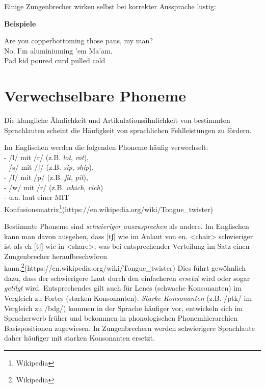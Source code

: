 \documentclass[
  letterpaper,
]{scrbook}
\begin{document}
Einige Zungenbrecher wirken selbst bei korrekter Aussprache lustig:\\

\begin{tcolorbox}[enhanced jigsaw, opacityback=0, colback=white, breakable, toprule=.15mm, rightrule=.15mm, bottomrule=.15mm, colframe=quarto-callout-note-color-frame, arc=.35mm, leftrule=.75mm, left=2mm]
\begin{minipage}[t]{5.5mm}
\textcolor{quarto-callout-note-color}{\faInfo}
\end{minipage}%
\begin{minipage}[t]{\textwidth - 5.5mm}

\textbf{Beispiele}\vspace{2mm}

Are you copperbottoming those pans, my man?\\
No, I'm aluminiuming 'em Ma'am.\\
Pad kid poured curd pulled cold

\end{minipage}%
\end{tcolorbox}

\hypertarget{verwechselbare-phoneme}{%
\section{Verwechselbare Phoneme}\label{verwechselbare-phoneme}}

Die klangliche Ähnlichkeit und Artikulationsähnlichkeit von bestimmten
Sprachlauten scheint die Häufigkeit von sprachlichen Fehlleistungen zu
fördern.

Im Englischen werden die folgenden Phoneme häufig verwechselt:\\
- /l/ mit /r/ (z.B. \emph{lot}, \emph{rot}),\\
- /s/ mit /ʃ/ (z.B. \emph{sip}, \emph{ship}).\\
- /f/ mit /p/ (z.B. \emph{fit}, \emph{pit}),\\
- /w/ mit /r/ (z.B. \emph{which}, \emph{rich})\\
- u.a. laut einer MIT
Konfusionsmatrix\footnote{Wikipedia}(https://en.wikipedia.org/wiki/Tongue\_twister)

Bestimmte Phoneme sind \emph{schwieriger auszusprechen} als andere. Im
Englischen kann man davon ausgehen, dass {[}tʃ{]} wie im Anlaut von en.
\textless chair\textgreater{} schwieriger ist als ch {[}tʃ{]} wie in
\textless share\textgreater, was bei entsprechender Verteilung im Satz
einen Zungenbrecher heraufbeschwören
kann.\footnote{Wikipedia}(https://en.wikipedia.org/wiki/Tongue\_twister)
Dies führt gewöhnlich dazu, dass der schwierigere Laut durch den
einfacheren \emph{ersetzt} wird oder sogar \emph{getilgt} wird.
Entsprechendes gilt auch für Lenes (schwache Konsonanten) im Vergleich
zu Fortes (starken Konsonanten). \emph{Starke Konsonanten} (z.B. /ptk/
im Vergleich zu /bdg/) kommen in der Sprache häufiger vor, entwickeln
sich im Spracherwerb früher und bekommen in phonologischen
Phonemhierarchien Basispositionen zugewiesen. In Zungenbrechern werden
schwierigere Sprachlaute daher häufiger mit starken Konsonanten ersetzt.
\end{document}
